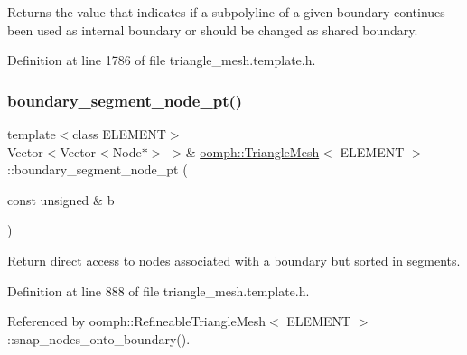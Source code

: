 Returns the value that indicates if a subpolyline of a given boundary continues been used as internal boundary or should be changed as shared boundary. 



Definition at line 1786 of file triangle\+\_\+mesh.\+template.\+h.

\mbox{\label{classoomph_1_1TriangleMesh_a7afa9227b19c754d3d2284afb613e84c}} 
\subsubsection{\texorpdfstring{boundary\+\_\+segment\+\_\+node\+\_\+pt()}{boundary\_segment\_node\_pt()}\hspace{0.1cm}{\footnotesize\ttfamily [1/3]}}
{\footnotesize\ttfamily template$<$class E\+L\+E\+M\+E\+NT$>$ \\
Vector$<$Vector$<$Node$\ast$$>$ $>$\& \hyperlink{classoomph_1_1TriangleMesh}{oomph\+::\+Triangle\+Mesh}$<$ E\+L\+E\+M\+E\+NT $>$\+::boundary\+\_\+segment\+\_\+node\+\_\+pt (\begin{DoxyParamCaption}\item[{const unsigned \&}]{b }\end{DoxyParamCaption})\hspace{0.3cm}{\ttfamily [inline]}}



Return direct access to nodes associated with a boundary but sorted in segments. 



Definition at line 888 of file triangle\+\_\+mesh.\+template.\+h.



Referenced by oomph\+::\+Refineable\+Triangle\+Mesh$<$ E\+L\+E\+M\+E\+N\+T $>$\+::snap\+\_\+nodes\+\_\+onto\+\_\+boundary().

\mbox{\label{classoomph_1_1TriangleMesh_afcfb27b6a9230629edbcf7b2f1cfbe48}} 
